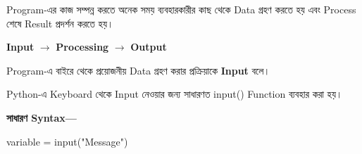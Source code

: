 
Program-এর কাজ সম্পন্ন করতে অনেক সময় ব্যবহারকারীর কাছ থেকে
Data গ্রহণ করতে হয় এবং Process শেষে Result প্রদর্শন করতে হয়।

\begin{center}
\textbf{Input}
\(\longrightarrow\)
\textbf{Processing}
\(\longrightarrow\)
\textbf{Output}
\end{center}



\begin{definitionbox}
Program-এ বাইরে থেকে প্রয়োজনীয় Data গ্রহণ করার প্রক্রিয়াকে
\textbf{Input} বলে।
\end{definitionbox}

Python-এ Keyboard থেকে Input নেওয়ার জন্য সাধারণত
\textenglish{\ttfamily input()}
Function ব্যবহার করা হয়।

\textbf{সাধারণ Syntax—}

\begin{codebox}
\begin{english}
\ttfamily
variable = input("Message")
\end{english}
\end{codebox}


